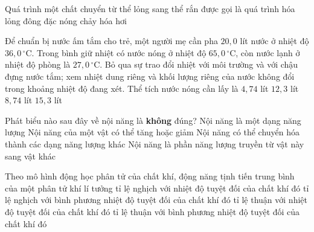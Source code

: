 	\begin{ex}%
		Quá trình một chất chuyển từ thể lỏng sang thể rắn được gọi là quá trình
		\choice
		{hóa lỏng}
		{\True đông đặc}
		{nóng chảy}
		{hóa hơi}
	\end{ex}

	\begin{ex}%
		Để chuẩn bị nước ấm tắm cho trẻ, một người mẹ cần pha $20{,}0$ lít nước ở nhiệt độ $36{,}0\,^\circ\text{C}$. Trong bình giữ nhiệt có nước nóng ở nhiệt độ $65{,}0\,^\circ\text{C}$, còn nước lạnh ở nhiệt độ phòng là $27{,}0\,^\circ\text{C}$. Bỏ qua sự trao đổi nhiệt với môi trường và với chậu đựng nước tắm; xem nhiệt dung riêng và khối lượng riêng của nước không đổi trong khoảng nhiệt độ đang xét. Thể tích nước nóng cần lấy là
		\choice
		{\True $4{,}74$ lít}
		{$12{,}3$ lít}
		{$8{,}74$ lít}
		{$15{,}3$ lít}
	\end{ex}

	\begin{ex}%
		Phát biểu nào sau đây về nội năng là \textbf{không} đúng?
		\choice
		{Nội năng là một dạng năng lượng}
		{Nội năng của một vật có thể tăng hoặc giảm}
		{Nội năng có thể chuyển hóa thành các dạng năng lượng khác}
		{\True Nội năng là phần năng lượng truyền từ vật này sang vật khác}
	\end{ex}

	\begin{ex}%
		Theo mô hình động học phân tử của chất khí, động năng tịnh tiến trung bình của một phân tử khí lí tưởng
		\choice
		{tỉ lệ nghịch với nhiệt độ tuyệt đối của chất khí đó}
		{tỉ lệ nghịch với bình phương nhiệt độ tuyệt đối của chất khí đó}
		{\True tỉ lệ thuận với nhiệt độ tuyệt đối của chất khí đó}
		{tỉ lệ thuận với bình phương nhiệt độ tuyệt đối của chất khí đó}
	\end{ex}

